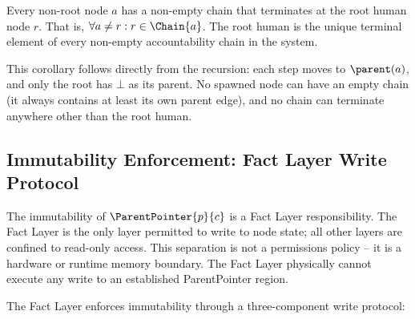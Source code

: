 \begin{corrollary}
Every non-root node $a$ has a non-empty chain that terminates at the root human node $r$. That is, $\forall a \neq r: r \in \Chain{a}$. The root human is the unique terminal element of every non-empty accountability chain in the system.
\end{corrollary}

This corollary follows directly from the recursion: each step moves to $\parent(a)$, and only the root has $\bot$ as its parent. No spawned node can have an empty chain (it always contains at least its own parent edge), and no chain can terminate anywhere other than the root human.

\subsection{Immutability Enforcement: Fact Layer Write Protocol}
\label{sec:immutability-enforcement}

The immutability of $\ParentPointer{p}{c}$ is a Fact Layer responsibility. The Fact Layer is the only layer permitted to write to node state; all other layers are confined to read-only access. This separation is not a permissions policy -- it is a hardware or runtime memory boundary. The Fact Layer physically cannot execute any write to an established ParentPointer region.

The Fact Layer enforces immutability through a three-component write protocol:

